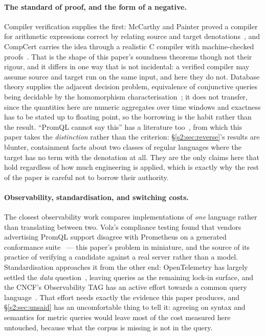 \paragraph{The standard of proof, and the form of a negative.}
Compiler verification supplies the first: McCarthy and Painter proved a compiler for
arithmetic expressions correct by relating source and target
denotations~\citep{mccarthy1967}, and CompCert carries the idea through a realistic C
compiler with machine-checked proofs~\citep{leroy2009}. That is the shape of this paper's
soundness theorems though not their rigour, and it differs in one way that is not
incidental: a verified compiler may assume source and target run on the same input, and
here they do not. Database theory supplies the adjacent decision problem, equivalence of
conjunctive queries being decidable by the homomorphism
characterisation~\citep{chandra1977,abiteboul1995}; it does not transfer, since the
quantities here are numeric aggregates over time windows and exactness has to be stated up
to floating point, so the borrowing is the habit rather than the result. ``PromQL cannot say
this'' has a literature too~\citep{felleisen1991,mitchell1993}, from which this paper takes
the \emph{distinction} rather than the criterion: \S\ref{s2:sec:reverse}'s results are
blunter, containment facts about two classes of regular languages where the target has no
term with the denotation at all. They are the only claims here that hold regardless of how
much engineering is applied, which is exactly why the rest of the paper is careful not to
borrow their authority.

\paragraph{Observability, standardisation, and switching costs.}
The closest observability work compares implementations of \emph{one} language rather than
translating between two. Volz's compliance testing found that vendors advertising PromQL
support disagree with Prometheus on a generated conformance suite~\citep{volz2020} --- this
paper's problem in miniature, and the source of its practice of verifying a candidate
against a real server rather than a model. Standardisation approaches it from the other
end: OpenTelemetry has largely settled the \emph{data} question~\citep{otel}, leaving
queries as the remaining lock-in surface, and the CNCF's Observability TAG has an active
effort towards a common query language~\citep{sharma2025}. That effort needs exactly the
evidence this paper produces, and \S\ref{s2:sec:unsaid} has an uncomfortable thing to tell
it: agreeing on syntax and semantics for metric queries would leave most of the cost
measured here untouched, because what the corpus is missing is not in the query.

